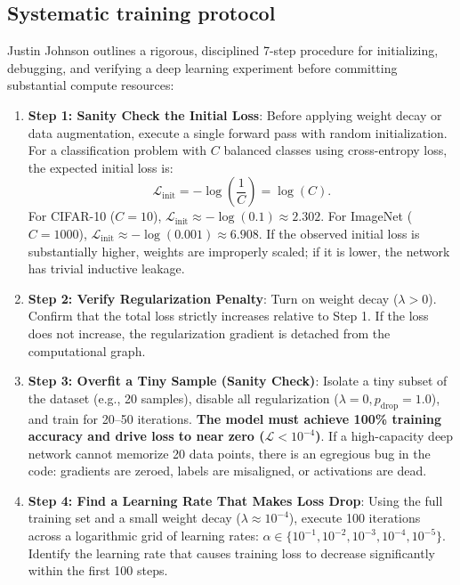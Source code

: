\subsection{Systematic training protocol}
\label{sec:seven_step_training_protocol}

Justin Johnson outlines a rigorous, disciplined 7-step procedure for initializing, debugging, and verifying a deep learning experiment before committing substantial compute resources:

\begin{enumerate}[leftmargin=*]
  \item \textbf{Step 1: Sanity Check the Initial Loss}:
    Before applying weight decay or data augmentation, execute a single forward pass with random initialization. For a classification problem with $C$ balanced classes using cross-entropy loss, the expected initial loss is:
    \begin{equation}
    \mathcal{L}_{\text{init}} = -\log\left(\frac{1}{C}\right) = \log(C).
    \label{eq:initial_loss_check}
    \end{equation}
    For CIFAR-10 ($C = 10$), $\mathcal{L}_{\text{init}} \approx -\log(0.1) \approx 2.302$. For ImageNet ($C = 1000$), $\mathcal{L}_{\text{init}} \approx -\log(0.001) \approx 6.908$. If the observed initial loss is substantially higher, weights are improperly scaled; if it is lower, the network has trivial inductive leakage.
  \item \textbf{Step 2: Verify Regularization Penalty}:
    Turn on weight decay ($\lambda > 0$). Confirm that the total loss strictly increases relative to Step 1. If the loss does not increase, the regularization gradient is detached from the computational graph.
  \item \textbf{Step 3: Overfit a Tiny Sample (Sanity Check)}:
    Isolate a tiny subset of the dataset (e.g., 20 samples), disable all regularization ($\lambda = 0, p_{\text{drop}} = 1.0$), and train for 20--50 iterations. \textbf{The model must achieve 100\% training accuracy and drive loss to near zero ($\mathcal{L} < 10^{-4}$)}. If a high-capacity deep network cannot memorize 20 data points, there is an egregious bug in the code: gradients are zeroed, labels are misaligned, or activations are dead.
  \item \textbf{Step 4: Find a Learning Rate That Makes Loss Drop}:
    Using the full training set and a small weight decay ($\lambda \approx 10^{-4}$), execute 100 iterations across a logarithmic grid of learning rates: $\alpha \in \{10^{-1}, 10^{-2}, 10^{-3}, 10^{-4}, 10^{-5}\}$. Identify the learning rate that causes training loss to decrease significantly within the first 100 steps.

\end{enumerate}
